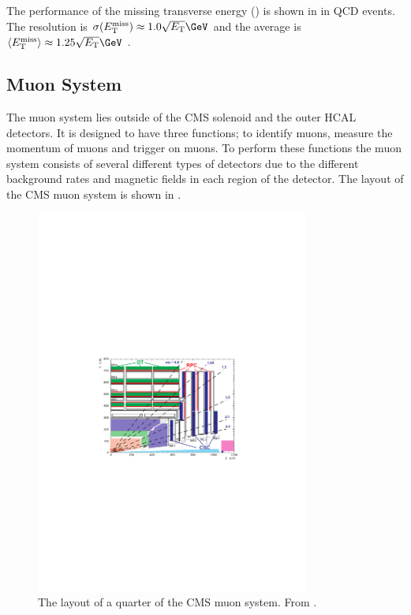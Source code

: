 The performance of the missing transverse energy (\ETm) is shown in
 in QCD events. The \ETm resolution is
$\sigma(\ETm) \approx 1.0 \sqrt{\ET}\GeV$ and the average \ETm is
$\langle \ETm \rangle \approx 1.25 \sqrt{\ET}\GeV$
\cite{chatrchyan2008cms}.

\subsection{Muon System}
The muon system lies outside of the CMS solenoid and the outer HCAL detectors.
It is designed to have three functions; to identify muons, measure the momentum
of muons and trigger on muons. To perform these functions the muon system
consists of several different types of detectors due to the different background
rates and magnetic fields in each region of the detector.
The layout of the {CMS} muon system is shown in .

\begin{figure}[htbp]
  \centering
  \includegraphics[width=0.8\textwidth]{muon_system}
  \caption[The layout of a quarter of the CMS muon system.] {The layout of a
quarter of the CMS muon system. From \cite{chatrchyan2008cms}.}
  \label{fig:muon_system}
\end{figure}

